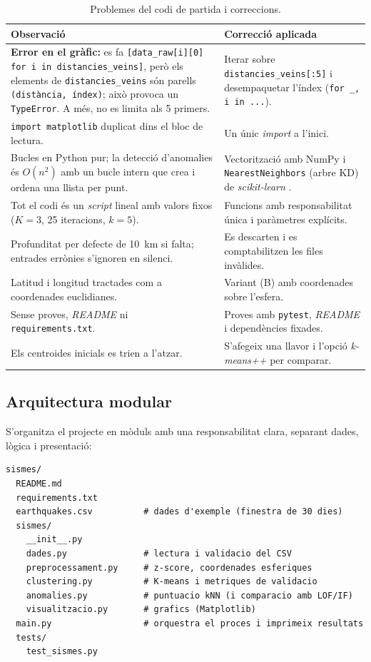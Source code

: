 \documentclass[11pt,a4paper]{article}
\begin{document}
\begin{table}[htbp]
\centering
\small
\begin{tabularx}{\textwidth}{@{}>{\raggedright\arraybackslash}p{4.4cm}>{\raggedright\arraybackslash}X@{}}
\toprule
\textbf{Observació} & \textbf{Correcció aplicada} \\
\midrule
\textbf{Error en el gràfic:} es fa
\texttt{[data\_raw[i][0] for i in distancies\_veins]}, però els elements de
\texttt{distancies\_veins} són parells \texttt{(distància, índex)}; això
provoca un \texttt{TypeError}. A més, no es limita als 5 primers. &
Iterar sobre \texttt{distancies\_veins[:5]} i desempaquetar l'índex
(\texttt{for \_, i in ...}). \\
\texttt{import matplotlib} duplicat dins el bloc de lectura. & Un únic
\textit{import} a l'inici. \\
Bucles en Python pur; la detecció d'anomalies és $O(n^2)$ amb un bucle
intern que crea i ordena una llista per punt. &
Vectorització amb NumPy i \texttt{NearestNeighbors} (arbre KD) de
\textit{scikit-learn} \cite{pedregosa2011}. \\
Tot el codi és un \textit{script} lineal amb valors fixos ($K=3$, 25
iteracions, $k=5$). & Funcions amb responsabilitat única i paràmetres
explícits. \\
Profunditat per defecte de 10~km si falta; entrades errònies s'ignoren en
silenci. & Es descarten i es comptabilitzen les files invàlides. \\
Latitud i longitud tractades com a coordenades euclidianes. &
Variant (B) amb coordenades sobre l'esfera. \\
Sense proves, \textit{README} ni \texttt{requirements.txt}. &
Proves amb \texttt{pytest}, \textit{README} i dependències fixades. \\
Els centroides inicials es trien a l'atzar. &
S'afegeix una llavor i l'opció \textit{k-means++} per comparar. \\
\bottomrule
\end{tabularx}
\caption{Problemes del codi de partida i correccions.}\label{tab:revisio}
\end{table}

\subsection{Arquitectura modular}
S'organitza el projecte en mòduls amb una responsabilitat clara, separant
dades, lògica i presentació:
\begin{lstlisting}[language={},numbers=none,caption={Estructura del projecte.}]
sismes/
  README.md
  requirements.txt
  earthquakes.csv          # dades d'exemple (finestra de 30 dies)
  sismes/
    __init__.py
    dades.py               # lectura i validacio del CSV
    preprocessament.py     # z-score, coordenades esferiques
    clustering.py          # K-means i metriques de validacio
    anomalies.py           # puntuacio kNN (i comparacio amb LOF/IF)
    visualitzacio.py       # grafics (Matplotlib)
  main.py                  # orquestra el proces i imprimeix resultats
  tests/
    test_sismes.py
\end{lstlisting}
\end{document}
